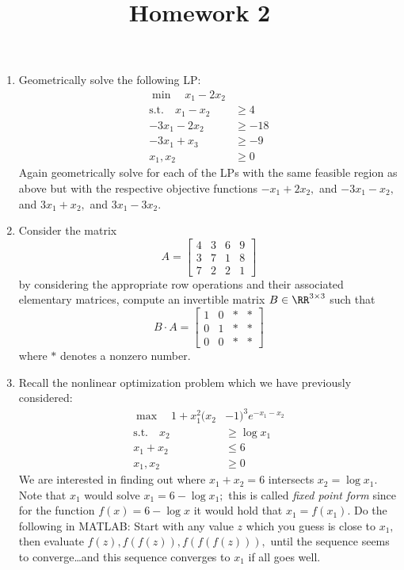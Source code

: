 \documentclass{article}
\begin{document}
\title{Homework 2}
\maketitle
\thispagestyle{fancy}

\begin{enumerate}
	\item Geometrically solve the following LP:
		\begin{align*}
			\min \quad x_1-2x_2 & \\
			\text{s.t.}\quad x_1-x_2&\ge 4 \\
			-3x_1-2x_2&\ge -18 \\
			-3x_1+x_3&\ge-9 \\
			x_1, x_2 &\ge 0
		\end{align*}
		Again geometrically solve for each of the LPs with the same feasible region as above but with the respective objective functions $-x_1+2x_2,$ and $-3x_1-x_2,$ and $3x_1+x_2,$ and $3x_1-3x_2.$ 

	\item Consider the matrix \[A=\begin{bmatrix}
				4 & 3 & 6 & 9 \\
				3 & 7 & 1 & 8 \\
				7 & 2 & 2 & 1
		\end{bmatrix}\] by considering the appropriate row operations and their associated elementary matrices, compute an invertible matrix $B\in\RR^{3\times 3}$ such that \[B\cdot A = \begin{bmatrix}
				1 & 0 & * & * \\
				0 & 1 & * & * \\
				0 & 0 & * & *
		\end{bmatrix} \] where $*$ denotes a nonzero number.

	\item Recall the nonlinear optimization problem which we have previously considered: 
		\begin{align*}
			\max \quad 1+x_1^2(x_2&-1)^3e^{-x_1-x_2} \\
			\text{s.t.}\quad x_2&\ge\log x_1 \\
			x_1+x_2 &\le 6 \\
			x_1, x_2 &\ge 0
		\end{align*}
		We are interested in finding out where $x_1+x_2=6$ intersects $x_2=\log x_1.$ Note that $x_1$ would solve $x_1=6-\log x_1;$ this is called \textit{fixed point form} since for the function $f(x)=6-\log x$ it would hold that $x_1=f(x_1).$ Do the following in MATLAB: Start with any value $z$ which you guess is close to $x_1,$ then evaluate $f(z), f(f(z)), f(f(f(z))),$ until the sequence seems to converge\ldots and this sequence converges to $x_1$ if all goes well.


\end{enumerate}
\end{document}
